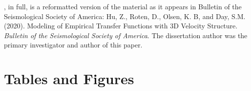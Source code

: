 , in full, is a reformatted version of the material as it appears in Bulletin of the Seismological Society of America: Hu, Z., Roten, D., Olsen, K. B, and Day, S.M. (2020). Modeling of Empirical Transfer Functions with 3D Velocity Structure. \emph{Bulletin of the Seismological Society of America}. The dissertation author was the primary investigator and author of this paper.

\newpage
\section*{Tables and Figures}
%


